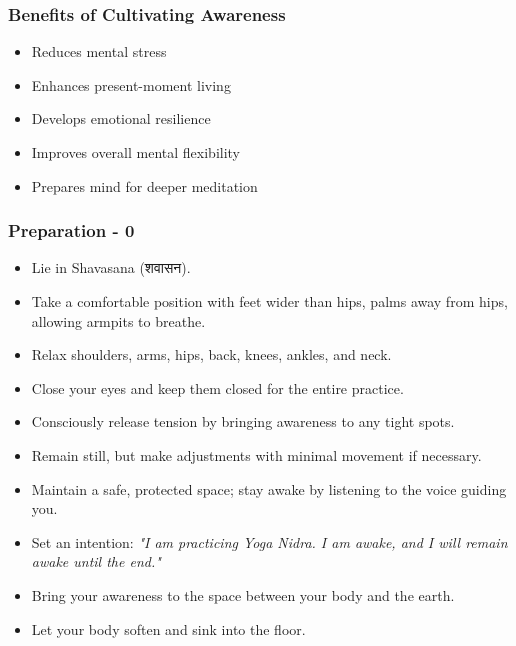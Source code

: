 \begin{frame}[fragile]\frametitle{Benefits of Cultivating Awareness}
    \begin{itemize}
        \item Reduces mental stress
        \item Enhances present-moment living
        \item Develops emotional resilience
        \item Improves overall mental flexibility
        \item Prepares mind for deeper meditation
    \end{itemize}
\end{frame}


\begin{frame}[fragile]\frametitle{Preparation - 0}
    \begin{itemize}
        \item Lie in Shavasana (शवासन).
        \item Take a comfortable position with feet wider than hips, palms away from hips, allowing armpits to breathe.
        \item Relax shoulders, arms, hips, back, knees, ankles, and neck.
        \item Close your eyes and keep them closed for the entire practice.
        \item Consciously release tension by bringing awareness to any tight spots.
        \item Remain still, but make adjustments with minimal movement if necessary.
        \item Maintain a safe, protected space; stay awake by listening to the voice guiding you.
        \item Set an intention: \textit{"I am practicing Yoga Nidra. I am awake, and I will remain awake until the end."}
        \item Bring your awareness to the space between your body and the earth.
        \item Let your body soften and sink into the floor.    
	\end{itemize}
	
\end{frame}

